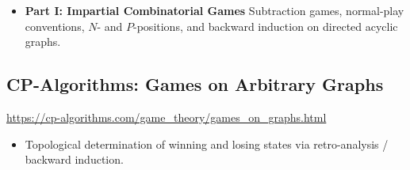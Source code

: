 \documentclass[11pt]{article}
\begin{document}
\begin{itemize}
    \item \textbf{Part I: Impartial Combinatorial Games} Subtraction games, normal-play conventions, $N$- and $P$-positions, and backward induction on directed acyclic graphs.
\end{itemize}

\subsection*{CP-Algorithms: Games on Arbitrary Graphs}
\url{https://cp-algorithms.com/game_theory/games_on_graphs.html}

\begin{itemize}
    \item Topological determination of winning and losing states via retro-analysis / backward induction.
\end{itemize}
\end{document}
